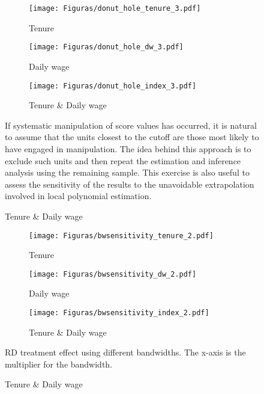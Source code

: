\begin{figure}[H]
     \caption{Donut-hole sensitivity (Calculator + letter treatment)}
    \label{donut_hole_t3}
\begin{center}
\begin{subfigure}{0.475\textwidth}
\caption{Tenure}
        \texttt{[image: Figuras/donut\_hole\_tenure\_3.pdf]}
    \end{subfigure}
    \begin{subfigure}{0.475\textwidth}
\caption{Daily wage}
        \texttt{[image: Figuras/donut\_hole\_dw\_3.pdf]}
    \end{subfigure}
    \begin{subfigure}{0.475\textwidth}
\caption{Tenure \& Daily wage}
        \texttt{[image: Figuras/donut\_hole\_index\_3.pdf]}
    \end{subfigure}    
  \end{center}
  
    \scriptsize  If systematic manipulation of score values has occurred, it is natural to assume that the units closest to the cutoff are those most likely to have engaged in manipulation. The idea behind this approach is to exclude such units and then repeat the estimation and inference analysis using the remaining sample. This exercise is also useful to assess the sensitivity of the results to the unavoidable extrapolation involved in local polynomial estimation.
\end{figure}




\begin{figure}[H]
     \caption{Sensitivity to bandwidth choice (Calculator treatment)}
    \label{bwsensitivity_t2}
\begin{center}
\begin{subfigure}{0.475\textwidth}
\caption{Tenure}
        \texttt{[image: Figuras/bwsensitivity\_tenure\_2.pdf]}
    \end{subfigure}
    \begin{subfigure}{0.475\textwidth}
\caption{Daily wage}
        \texttt{[image: Figuras/bwsensitivity\_dw\_2.pdf]}
    \end{subfigure}
    \begin{subfigure}{0.475\textwidth}
\caption{Tenure \& Daily wage}
        \texttt{[image: Figuras/bwsensitivity\_index\_2.pdf]}
    \end{subfigure}    
  \end{center}
  
    \scriptsize  RD treatment effect using different bandwidths. The x-axis is the multiplier for the bandwidth.
\end{figure}


